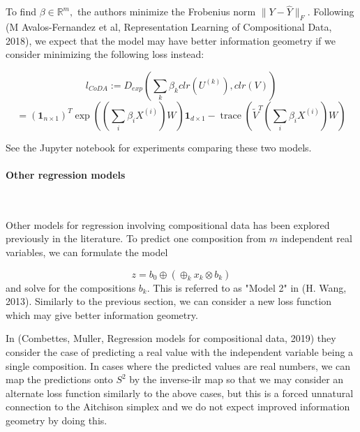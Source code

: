 \documentclass[a4paper,12pt]{article}
\begin{document}
To find $\beta \in \mathbb{R}^m,$ the authors minimize the Frobenius norm $ \| Y - \hat{Y} \|_F.$ Following (M Avalos-Fernandez et al,  Representation Learning of Compositional Data, 2018), we expect that the model may have better information geometry if we consider minimizing the following loss instead:

$$ l_{CoDA} := D_{exp} \left( \sum_k \beta_k clr(U^{(k)} ), clr(V) \right)$$
$$ = (\mathbf{1}_{n \times 1})^T \exp \left( (\sum_i \beta_i X^{(i)})W \right) \mathbf{1}_{d\times 1} - \operatorname{trace}(\tilde{V}^T (\sum_i \beta_i X^{(i)})W )$$

See the Jupyter notebook for experiments comparing these two models.

\paragraph{Other regression models}
\
\newline

Other models for regression involving compositional data has been explored previously in the literature. To predict one composition from $m$ independent real variables, we can formulate the model 

$$ z = b_0 \oplus (\oplus_{k} x_k \otimes b_k)$$ and solve for the compositions $b_k.$ This is referred to as "Model 2" in (H. Wang, 2013). Similarly to the previous section, we can consider a new loss function which may give better information geometry.

In (Combettes, Muller, Regression models for compositional data, 2019) they consider the case of predicting a real value with the independent variable being a single composition. In cases where the predicted values are real numbers, we can map the predictions onto $S^2$ by the inverse-ilr map so that we may consider an alternate loss function similarly to the above cases, but this is a forced unnatural connection to the Aitchison simplex and we do not expect improved information geometry by doing this. 
\end{document}
